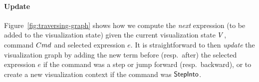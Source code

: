 % 

\paragraph{Update}
%
Figure~\ref{fig:traversing-graph} shows
how we compute the \emph{next} expression
(to be added to the visualization state)
given the current visualization state
$V$, command $Cmd$ and selected
expression $e$.
%
It is straightforward to then \emph{update}
the visualization graph by adding the new
term before (resp.\ after) the selected
expression $e$ if the command was a step
or jump forward (resp.\ backward), or
to create a new visualization context
if the command was $\mathsf{StepInto}$.


